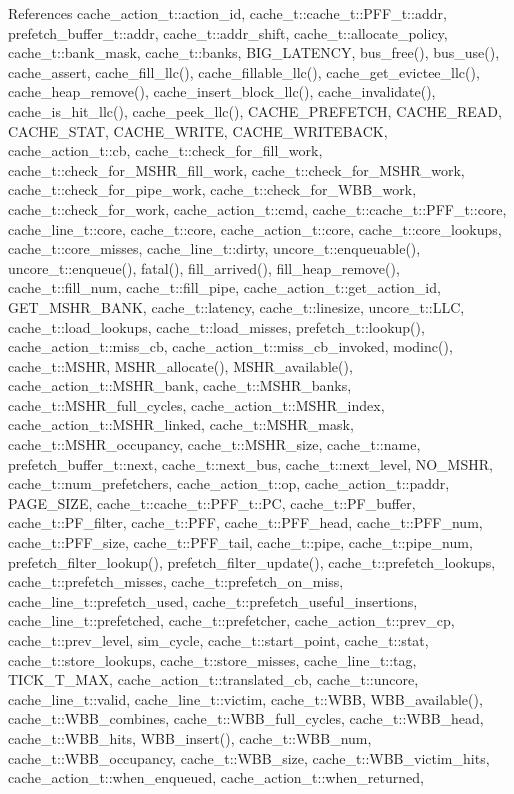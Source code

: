 References cache\_\-action\_\-t::action\_\-id, cache\_\-t::cache\_\-t::PFF\_\-t::addr, prefetch\_\-buffer\_\-t::addr, cache\_\-t::addr\_\-shift, cache\_\-t::allocate\_\-policy, cache\_\-t::bank\_\-mask, cache\_\-t::banks, BIG\_\-LATENCY, bus\_\-free(), bus\_\-use(), cache\_\-assert, cache\_\-fill\_\-llc(), cache\_\-fillable\_\-llc(), cache\_\-get\_\-evictee\_\-llc(), cache\_\-heap\_\-remove(), cache\_\-insert\_\-block\_\-llc(), cache\_\-invalidate(), cache\_\-is\_\-hit\_\-llc(), cache\_\-peek\_\-llc(), CACHE\_\-PREFETCH, CACHE\_\-READ, CACHE\_\-STAT, CACHE\_\-WRITE, CACHE\_\-WRITEBACK, cache\_\-action\_\-t::cb, cache\_\-t::check\_\-for\_\-fill\_\-work, cache\_\-t::check\_\-for\_\-MSHR\_\-fill\_\-work, cache\_\-t::check\_\-for\_\-MSHR\_\-work, cache\_\-t::check\_\-for\_\-pipe\_\-work, cache\_\-t::check\_\-for\_\-WBB\_\-work, cache\_\-t::check\_\-for\_\-work, cache\_\-action\_\-t::cmd, cache\_\-t::cache\_\-t::PFF\_\-t::core, cache\_\-line\_\-t::core, cache\_\-t::core, cache\_\-action\_\-t::core, cache\_\-t::core\_\-lookups, cache\_\-t::core\_\-misses, cache\_\-line\_\-t::dirty, uncore\_\-t::enqueuable(), uncore\_\-t::enqueue(), fatal(), fill\_\-arrived(), fill\_\-heap\_\-remove(), cache\_\-t::fill\_\-num, cache\_\-t::fill\_\-pipe, cache\_\-action\_\-t::get\_\-action\_\-id, GET\_\-MSHR\_\-BANK, cache\_\-t::latency, cache\_\-t::linesize, uncore\_\-t::LLC, cache\_\-t::load\_\-lookups, cache\_\-t::load\_\-misses, prefetch\_\-t::lookup(), cache\_\-action\_\-t::miss\_\-cb, cache\_\-action\_\-t::miss\_\-cb\_\-invoked, modinc(), cache\_\-t::MSHR, MSHR\_\-allocate(), MSHR\_\-available(), cache\_\-action\_\-t::MSHR\_\-bank, cache\_\-t::MSHR\_\-banks, cache\_\-t::MSHR\_\-full\_\-cycles, cache\_\-action\_\-t::MSHR\_\-index, cache\_\-action\_\-t::MSHR\_\-linked, cache\_\-t::MSHR\_\-mask, cache\_\-t::MSHR\_\-occupancy, cache\_\-t::MSHR\_\-size, cache\_\-t::name, prefetch\_\-buffer\_\-t::next, cache\_\-t::next\_\-bus, cache\_\-t::next\_\-level, NO\_\-MSHR, cache\_\-t::num\_\-prefetchers, cache\_\-action\_\-t::op, cache\_\-action\_\-t::paddr, PAGE\_\-SIZE, cache\_\-t::cache\_\-t::PFF\_\-t::PC, cache\_\-t::PF\_\-buffer, cache\_\-t::PF\_\-filter, cache\_\-t::PFF, cache\_\-t::PFF\_\-head, cache\_\-t::PFF\_\-num, cache\_\-t::PFF\_\-size, cache\_\-t::PFF\_\-tail, cache\_\-t::pipe, cache\_\-t::pipe\_\-num, prefetch\_\-filter\_\-lookup(), prefetch\_\-filter\_\-update(), cache\_\-t::prefetch\_\-lookups, cache\_\-t::prefetch\_\-misses, cache\_\-t::prefetch\_\-on\_\-miss, cache\_\-line\_\-t::prefetch\_\-used, cache\_\-t::prefetch\_\-useful\_\-insertions, cache\_\-line\_\-t::prefetched, cache\_\-t::prefetcher, cache\_\-action\_\-t::prev\_\-cp, cache\_\-t::prev\_\-level, sim\_\-cycle, cache\_\-t::start\_\-point, cache\_\-t::stat, cache\_\-t::store\_\-lookups, cache\_\-t::store\_\-misses, cache\_\-line\_\-t::tag, TICK\_\-T\_\-MAX, cache\_\-action\_\-t::translated\_\-cb, cache\_\-t::uncore, cache\_\-line\_\-t::valid, cache\_\-line\_\-t::victim, cache\_\-t::WBB, WBB\_\-available(), cache\_\-t::WBB\_\-combines, cache\_\-t::WBB\_\-full\_\-cycles, cache\_\-t::WBB\_\-head, cache\_\-t::WBB\_\-hits, WBB\_\-insert(), cache\_\-t::WBB\_\-num, cache\_\-t::WBB\_\-occupancy, cache\_\-t::WBB\_\-size, cache\_\-t::WBB\_\-victim\_\-hits, cache\_\-action\_\-t::when\_\-enqueued, cache\_\-action\_\-t::when\_\-returned, 